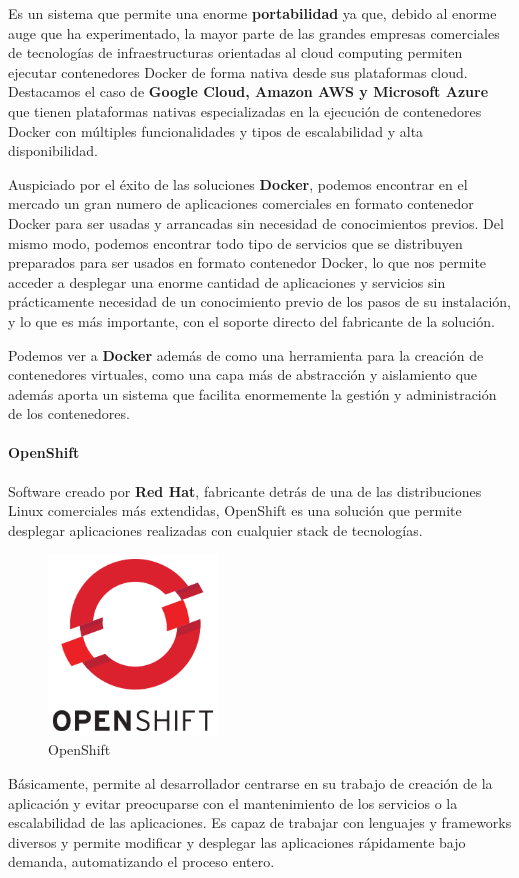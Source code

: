 Es un sistema que permite una enorme \textbf{portabilidad} ya que, debido al enorme auge que ha experimentado, la mayor parte de las grandes empresas comerciales de tecnologías de infraestructuras orientadas al cloud computing permiten ejecutar contenedores Docker de forma nativa desde sus plataformas cloud. Destacamos el caso de \textbf{Google Cloud, Amazon AWS y Microsoft Azure} que tienen plataformas nativas especializadas en la ejecución de contenedores Docker con múltiples funcionalidades y tipos de escalabilidad y alta disponibilidad.

Auspiciado por el éxito de las soluciones \textbf{Docker}, podemos encontrar en el mercado un gran numero de aplicaciones comerciales en formato contenedor Docker para ser usadas y arrancadas sin necesidad de conocimientos previos. Del mismo modo, podemos encontrar todo tipo de servicios que se distribuyen preparados para ser usados en formato contenedor Docker, lo que nos permite acceder a desplegar una enorme cantidad de aplicaciones y servicios sin
prácticamente necesidad de un conocimiento previo de los pasos de su instalación, y lo que es más importante, con el soporte directo del fabricante de la solución.

Podemos ver a \textbf{Docker} además de como una herramienta para la creación de contenedores virtuales, como una capa más de abstracción y aislamiento que además aporta un sistema que facilita enormemente la gestión y administración de los contenedores.
\paragraph{OpenShift}
Software creado por \textbf{Red Hat}, fabricante detrás de una de las distribuciones Linux comerciales más extendidas, OpenShift es una solución que permite desplegar aplicaciones realizadas con cualquier stack de tecnologías.\cite{openshift}
\begin{figure}[H]
	\centering
	\includegraphics[width=0.4\textwidth]{imagenes/entorno/openshift.png}
	\caption{OpenShift} \label{openshift}
\end{figure}
Básicamente, permite al desarrollador centrarse en su trabajo de creación de la aplicación y evitar preocuparse con el mantenimiento de los servicios o la escalabilidad de las aplicaciones. Es capaz de trabajar con lenguajes y frameworks diversos y permite modificar y desplegar las aplicaciones rápidamente bajo demanda, automatizando el proceso entero.

